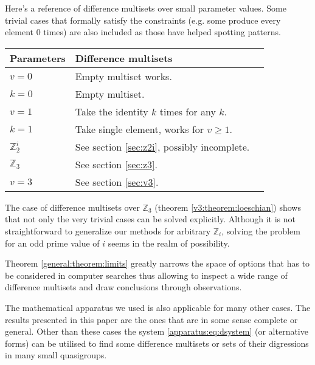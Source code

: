 Here's a reference of difference multisets over small parameter values. Some trivial cases that formally satisfy the constraints (e.g. some produce every element 0 times) are also included as those have helped spotting patterns.

\begin{tabular}{llr}
\toprule
    Parameters & Difference multisets \\
\midrule
    $v = 0$ & Empty multiset works. \\
    $k = 0$ & Empty multiset. \\
    $v = 1$ & Take the identity $k$ times for any $k$. \\
    $k = 1$ & Take single element, works for $v \geq 1$. \\
    $\mathbb Z_2^i$ & See section \ref{sec:z2i}, possibly incomplete. \\
    $\mathbb Z_3$ & See section \ref{sec:z3}. \\
    $v = 3$ & See section \ref{sec:v3}. \\    
\bottomrule
\end{tabular}


The case of difference multisets over $\mathbb Z_3$ (theorem \ref{v3:theorem:loeschian}) shows that not only the very trivial cases can be solved explicitly. Although it is not straightforward to generalize our methods for arbitrary $\mathbb Z_i$, solving the problem for an odd prime value of $i$ seems in the realm of possibility.

Theorem \ref{general:theorem:limits} greatly narrows the space of options that has to be considered in computer searches thus allowing to inspect a wide range of difference multisets and draw conclusions through observations.

The mathematical apparatus we used is also applicable for many other cases. The results presented in this paper are the ones that are in some sense complete or general. Other than these cases the system \eqref{apparatus:eq:dsystem} (or alternative forms) can be utilised to find some difference multisets or sets of their digressions in many small quasigroups. 
